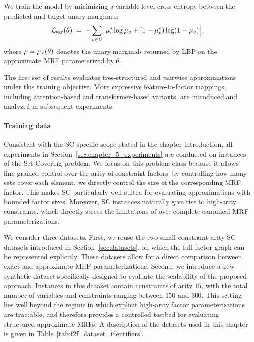 We train the model by minimizing a variable-level cross-entropy between the predicted and target unary marginals:
\begin{equation}
\mathcal{L}_{\mathrm{var}}(\theta)
\;=\;
-\sum_{v\in \mathcal{V}}
\Bigl[
\mu^{\star}_v \log \mu_v
+
(1-\mu^{\star}_v)\log(1-\mu_v)
\Bigr],
\label{eq:var_ce_loss}
\end{equation}
where $\mu=\mu_{x}(\theta)$ denotes the unary marginals returned by LBP on the approximate MRF parameterized by $\theta$.

The first set of results evaluates tree-structured and pairwise approximations under this training objective. More expressive feature-to-factor mappings, including attention-based and transformer-based variants, are introduced and analyzed in subsequent experiments.

\paragraph{Training data}
Consistent with the SC-specific scope stated in the chapter introduction, all experiments in Section~\ref{sec:chapter_5_experiments} are conducted on instances of the Set Covering problem. We focus on this problem class because it allows fine-grained control over the arity of constraint factors: by controlling how many sets cover each element, we directly control the size of the corresponding MRF factor. This makes SC particularly well suited for evaluating approximations with bounded factor sizes. Moreover, SC instances naturally give rise to high-arity constraints, which directly stress the limitations of over-complete canonical MRF parameterizations.

We consider three datasets. First, we reuse the two small-constraint-arity SC datasets introduced in Section~\ref{sec:datasets}, on which the full factor graph can be represented explicitly. These datasets allow for a direct comparison between exact and approximate MRF parameterizations. Second, we introduce a new synthetic dataset specifically designed to evaluate the scalability of the proposed approach. Instances in this dataset contain constraints of arity $15$, with the total number of variables and constraints ranging between $150$ and $300$. This setting lies well beyond the regime in which explicit high-arity factor parameterizations are tractable, and therefore provides a controlled testbed for evaluating structured approximate MRFs. A description of the datasets used in this chapter is given in Table~\ref{tab:f2f_dataset_identifiers}.


